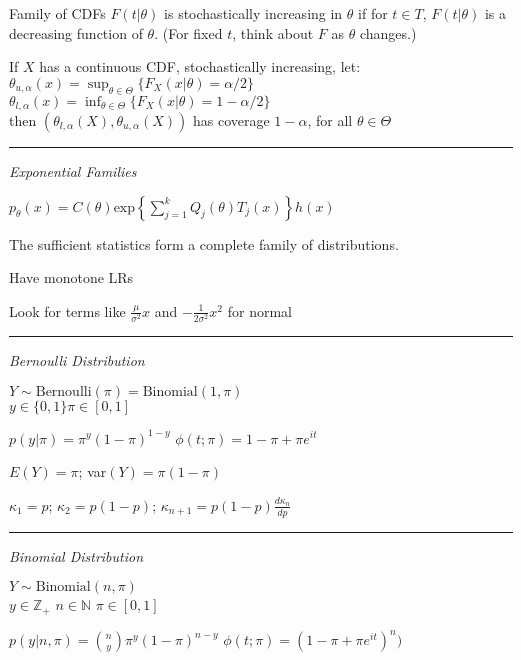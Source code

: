 \documentclass[notitlepage,10pt,twocolumn]{article}
\renewcommand\exp[1]{\text{exp}\left\{ #1 \right\}}
\begin{document}
Family of CDFs $F(t|\theta)$ is stochastically increasing in $\theta$ if for $t\in T$, $F(t|\theta)$ is a decreasing function of $\theta$. (For fixed $t$, think about $F$ as $\theta$ changes.)

If $X$ has a continuous CDF, stochastically increasing, let:\\
$\theta_{u,\alpha}(x) = \sup_{\theta\in\Theta}\{F_X(x|\theta)=\alpha/2\}$\\
$\theta_{l,\alpha}(x) = \inf_{\theta\in\Theta}\{F_X(x|\theta)=1-\alpha/2\}$\\
then $(\theta_{l,\alpha}(X),\theta_{u,\alpha}(X))$ has coverage $1-\alpha$, for all $\theta \in \Theta$

\vspace{.2cm} \hrule \vspace{.2cm}

\emph{\sffamily Exponential Families}

$p_\theta(x) = C(\theta)\exp{\sum_{j=1}^k Q_j(\theta)T_j(x)}h(x)$

The sufficient statistics form a complete family of distributions.

Have monotone LRs

Look for terms like $ \frac{\mu}{\sigma^2}x$ and $-\frac{1}{2\sigma^2}x^2$ for normal

\vspace{.15cm}\hrule \vspace{.15cm}

\emph{\sffamily Bernoulli Distribution}

$Y\sim \text{Bernoulli}(\pi) = \text{Binomial}(1,\pi)$\\
$y\in \{0,1\}$\quad $\pi \in [0,1]$

$p(y|\pi) = \pi^y (1-\pi)^{1-y}$ \quad $\phi(t;\pi) = 1-\pi+\pi e^{it}$

$E(Y) = \pi$; var$(Y) = \pi(1-\pi)$

$\kappa_1 = p$; $\kappa_2=p(1-p)$; $\kappa_{n+1} = p(1-p)\frac{d\kappa_n}{dp}$

\vspace{.15cm}\hrule \vspace{.15cm}

\emph{\sffamily Binomial Distribution}

$Y \sim \text{Binomial}(n,\pi)$\\
$y\in\mathbb{Z}_{+}$\quad
$n \in \mathbb{N}$ \quad $\pi \in [0,1]$

$p(y|n,\pi) = \binom{n}{y} \pi^y (1-\pi)^{n-y}$ \quad $\phi(t;\pi)=(1-\pi + \pi e^{it})^n)$
\end{document}
